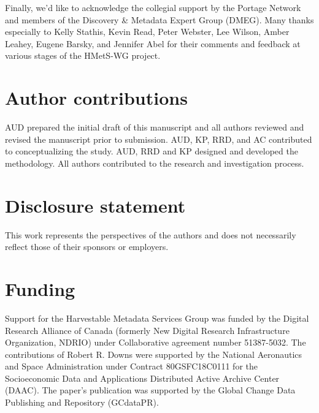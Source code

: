 \documentclass{interact}
\begin{document}
Finally, we'd like to acknowledge the collegial support by the Portage Network and members of the Discovery \& Metadata Expert Group (DMEG). Many thanks especially to Kelly Stathis, Kevin Read, Peter Webster, Lee Wilson, Amber Leahey, Eugene Barsky, and Jennifer Abel for their comments and feedback at various stages of the HMetS-WG project.

\section*{Author contributions}\label{author-disclosure}
AUD prepared the initial draft of this manuscript and all authors reviewed and revised the manuscript prior to submission. AUD, KP, RRD, and AC contributed to conceptualizing the study. AUD, RRD and KP designed and developed the methodology. All authors contributed to the research and investigation process.

\section*{Disclosure statement}\label{disclosure-statement}
This work represents the perspectives of the authors and does not necessarily reflect those of their sponsors or employers.

\section*{Funding}\label{funding}

Support for the Harvestable Metadata Services Group was funded by the Digital Research Alliance of Canada (formerly New Digital Research Infrastructure Organization, NDRIO) under Collaborative agreement number 51387-5032. 
The contributions of Robert R. Downs were supported by the National Aeronautics and Space Administration under Contract 80GSFC18C0111 for the Socioeconomic Data and Applications Distributed Active Archive Center (DAAC).
The paper's publication was supported by the Global Change Data Publishing and Repository (GCdataPR).
\end{document}
